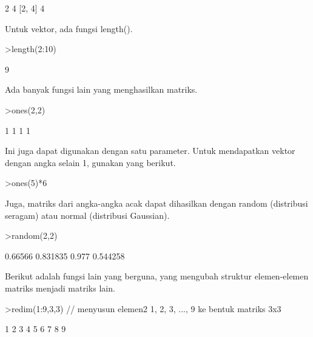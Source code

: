 \documentclass[a4paper,10pt]{article}
\begin{document}
\begin{eulernotebook}
\begin{eulercomment}
\begin{eulercomment}
\begin{eulercomment}
\begin{eulercomment}
\begin{euleroutput}
  2
  4
  [2,  4]
  4
\end{euleroutput}
\begin{eulercomment}
Untuk vektor, ada fungsi length().
\end{eulercomment}
\begin{eulerprompt}
>length(2:10)
\end{eulerprompt}
\begin{euleroutput}
  9
\end{euleroutput}
\begin{eulercomment}
Ada banyak fungsi lain yang menghasilkan matriks.
\end{eulercomment}
\begin{eulerprompt}
>ones(2,2)
\end{eulerprompt}
\begin{euleroutput}
              1             1 
              1             1 
\end{euleroutput}
\begin{eulercomment}
Ini juga dapat digunakan dengan satu parameter. Untuk mendapatkan
vektor dengan angka selain 1, gunakan yang berikut.
\end{eulercomment}
\begin{eulerprompt}
>ones(5)*6
\end{eulerprompt}
\begin{euleroutput}
  [6,  6,  6,  6,  6]
\end{euleroutput}
\begin{eulercomment}
Juga, matriks dari angka-angka acak dapat dihasilkan dengan random
(distribusi seragam) atau normal (distribusi Gaussian).
\end{eulercomment}
\begin{eulerprompt}
>random(2,2)
\end{eulerprompt}
\begin{euleroutput}
        0.66566      0.831835 
          0.977      0.544258 
\end{euleroutput}
\begin{eulercomment}
Berikut adalah fungsi lain yang berguna, yang mengubah struktur
elemen-elemen matriks menjadi matriks lain.
\end{eulercomment}
\begin{eulerprompt}
>redim(1:9,3,3) // menyusun elemen2 1, 2, 3, ..., 9 ke bentuk matriks 3x3
\end{eulerprompt}
\begin{euleroutput}
              1             2             3 
              4             5             6 
              7             8             9 

\end{euleroutput}
\end{eulercomment}
\end{eulercomment}
\end{eulercomment}
\end{eulercomment}
\end{eulernotebook}
\end{document}
